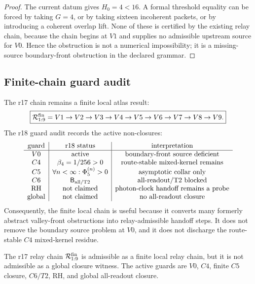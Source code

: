 \begin{proof}
The current datum gives \(H_0=4<16\).  A formal threshold equality can be forced
by taking \(G=4\), or by taking sixteen incoherent packets, or by introducing a
coherent overlap lift.  None of these is certified by the existing relay chain,
because the chain begins at \(V1\) and supplies no admissible upstream source for
\(V0\).  Hence the obstruction is not a numerical impossibility; it is a
missing-source boundary-front obstruction in the declared grammar.
\end{proof}

\subsection{Finite-chain guard audit}
\label{subsec:v470-r18-finite-chain-guard-audit}

The r17 chain remains a finite local atlas result:
\[
\boxed{
\mathcal R_{1:9}^{\rm fin}
=
V1\to V2\to V3\to V4\to V5\to V6\to V7\to V8\to V9.
}
\]
The r18 guard audit records the active non-closures:
\[
\begin{array}{c|c|c}
\text{guard} & \text{r18 status} & \text{interpretation}\\
\hline
V0 & \text{active} & \text{boundary-front source deficient}\\
C4 & \beta_4=1/256>0 & \text{route-stable mixed-kernel remains}\\
C5 & \forall n<\infty:\Phi_5^{(n)}>0 & \text{asymptotic collar only}\\
C6 & \mathsf B_{\rm all/T2} & \text{all-readout/T2 blocked}\\
\mathrm{RH} & \text{not claimed} & \text{photon-clock handoff remains a probe}\\
\mathrm{global} & \text{not claimed} & \text{no all-readout closure}
\end{array}
\]
Consequently, the finite local chain is useful because it converts many formerly
abstract valley-front obstructions into relay-admissible handoff steps.  It does
not remove the boundary source problem at \(V0\), and it does not discharge the
route-stable \(C4\) mixed-kernel residue.

\begin{proposition}
\label{prop:v470-r18-finite-chain-guard}
The r17 relay chain \(\mathcal R_{1:9}^{\rm fin}\) is admissible as a finite
local relay chain, but it is not admissible as a global closure witness.  The
active guards are \(V0\), \(C4\), finite \(C5\) closure, \(C6/T2\), RH, and
global all-readout closure.
\end{proposition}

